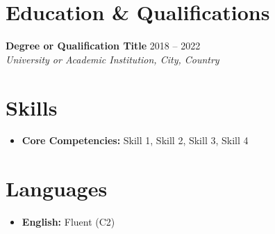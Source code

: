 \documentclass[10pt,a4paper]{article}
\begin{document}
\section{Education \& Qualifications}
\textbf{Degree or Qualification Title} \hfill {\small 2018 -- 2022}\\
{\textit{University or Academic Institution, City, Country}}\\
\vspace{3pt}

\section{Skills}
\begin{itemize}[leftmargin=1em, itemsep=1pt, topsep=2pt]
  \item \textbf{Core Competencies:} Skill 1, Skill 2, Skill 3, Skill 4
\end{itemize}

\section{Languages}
\begin{itemize}[leftmargin=1em, itemsep=1pt, topsep=2pt]
  \item \textbf{English:} Fluent (C2)
\end{itemize}
\end{document}

